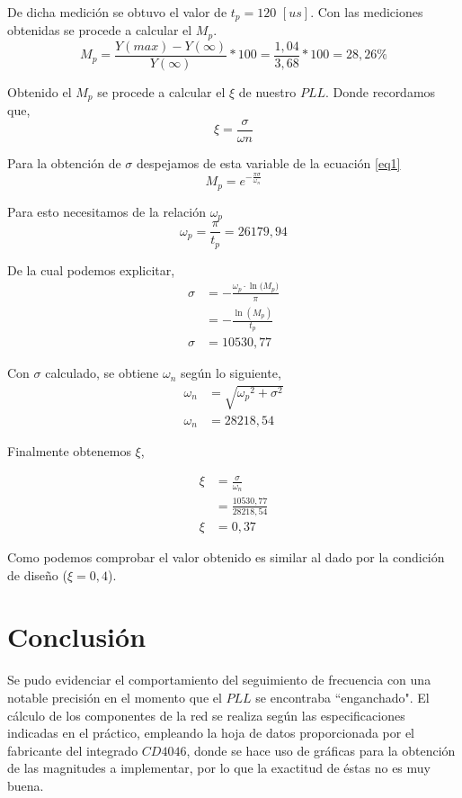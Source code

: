 \documentclass[twocolumn]{article}
\begin{document}
De dicha medición se obtuvo el valor de $t_p = 120$ $[us]$. Con las mediciones obtenidas se procede a calcular el $M_p$.
\[ M_p = \frac{Y(max) - Y(\infty)} {Y(\infty)} * 100 = \frac{1,04}{3,68} * 100 = 28,26 \%\]

Obtenido el $M_p$ se procede a calcular el $\xi$ de nuestro $PLL$. Donde recordamos que,
\[ \xi = \frac{\sigma}{\omega n} \]

Para la obtención de $\sigma$ despejamos de esta variable de la ecuación \textcolor{blue}{\ref{eq1}}
\begin{equation}
	M_{p} = e^{-\frac{\pi \sigma}{\omega_{n}}}
	\label{eq1}
\end{equation}

Para esto necesitamos de la relación $\omega_{p}$
\[
	\omega_{p} = \frac{\pi}{t_{p}} = 26179,94 
\] 

De la cual podemos explicitar,
\begin{align*}
	\sigma &= - \frac{\omega_{p} \cdot \ln({M_{p})}}{\pi} \\
		   &= - \frac{\ln(M_{p})}{t_p}\\
	\sigma &=   10530,77
\end{align*}

Con $\sigma$ calculado, se obtiene $\omega_{n}$ según lo siguiente,
\begin{align*}
	\omega_{n} &= \sqrt{{\omega_{p}}^{2}+ {\sigma}^{2}} \\
	\omega_{n} &= 28218,54
\end{align*}

Finalmente obtenemos $\xi$,

\begin{align*}
  \xi &= \frac{\sigma}{\omega_{n}} \\
      &= \frac{10530,77}{28218,54} \\
  \xi &= 0,37
\end{align*}

Como podemos comprobar el valor obtenido es similar al dado por la condición de diseño ($\xi = 0,4$).
 
\section{Conclusión}
Se pudo evidenciar el comportamiento del seguimiento de frecuencia con una notable precisión en el momento que el $PLL$ se encontraba ``enganchado".
El cálculo de los componentes de la red se realiza según las especificaciones indicadas en el práctico, empleando la hoja de datos proporcionada por el fabricante del integrado $CD4046$, donde se hace uso de gráficas para la obtención de las magnitudes a implementar, por lo que la exactitud de éstas no es muy buena.
\end{document}
